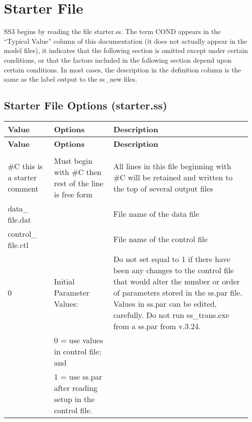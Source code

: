 
\section{Starter File}

SS3 begins by reading the file starter.ss. The term COND appears in the ``Typical Value'' column of this documentation (it does not actually appear in the model files), it indicates that the following section is omitted except under certain conditions, or that the factors included in the following section depend upon certain conditions. In most cases, the description in the definition column is the same as the label output to the ss\_new files.

{
\setlength\extrarowheight{4pt}
\begin{landscape}
\subsection{Starter File Options (starter.ss)}	

\begin{longtable}{p{1.5cm} p{7.2cm} p{12.3cm}} 

 \hline
 \textbf{Value} & \textbf{Options} & \textbf{Description} \TBstrut\\ 
 \hline
 \endfirsthead
 
 \hline
 \textbf{Value} & \textbf{Options} & \textbf{Description} \TBstrut\\ 
 \hline
 \endhead
 
 \hline
 \endfoot
 
 \hline
 \multicolumn{3}{c}{\textbf{End of Starter File}} \Tstrut\Bstrut\\
 \hline
 \endlastfoot

 \#C this is a starter comment & Must begin with \#C then rest of the line is free form & All lines in this file beginning with \#C will be retained and written to the top of several output files \Tstrut\\
		
 \hline
 data\_ file.dat &  & File name of the data file \Tstrut\\
		
 \hline
 control\_ file.ctl &  & File name of the control file \Tstrut\\
   
 \hline		
 0 & Initial Parameter Values: & \multirow{1}{1cm}[-0.25cm]{\parbox{12.5cm}{Do not set equal to 1 if there have been any changes to the control file that would alter the number or order of parameters stored in the ss.par file. Values in ss.par can be edited, carefully. Do not run ss\_trans.exe from a ss.par from v.3.24.}}\Tstrut\\
 & 0 = use values in control file; and&  \\
 & 1 = use ss.par after reading setup in the control file. & \\
		

\end{longtable}
\end{landscape}}
